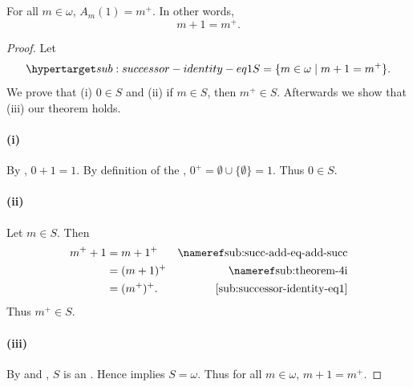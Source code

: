 \documentclass{report}
\begin{document}
\subsection{}%

\begin{lemma}

  For all $m \in \omega$, $A_m(1) = m^+$.
  In other words, $$m + 1 = m^+.$$

\end{lemma}

\begin{proof}


  Let
    \begin{equation}
      \hyperlabel{sub:successor-identity-eq1}
      S = \{m \in \omega \mid m + 1 = m^+\}.
    \end{equation}
  We prove that (i) $0 \in S$ and (ii) if $m \in S$, then $m^+ \in S$.
  Afterwards we show that (iii) our theorem holds.

  \paragraph{(i)}%

    By , $0 + 1 = 1$.
    By definition of the ,
      $0^+ = \emptyset \cup \{\emptyset\} = 1$.
    Thus $0 \in S$.

  \paragraph{(ii)}%

    Let $m \in S$.
    Then
      \begin{align*}
        m^+ + 1
          & = m + 1^+ & \textref{sub:succ-add-eq-add-succ} \\
          & = (m + 1)^+ & \textref{sub:theorem-4i} \\
          & = (m^+)^+. & \eqref{sub:successor-identity-eq1}
      \end{align*}
    Thus $m^+ \in S$.

  \paragraph{(iii)}%

    By  and
      , $S$ is an
      .
    Hence  implies $S = \omega$.
    Thus for all $m \in \omega$, $m + 1 = m^+$.

\end{proof}
\end{document}
